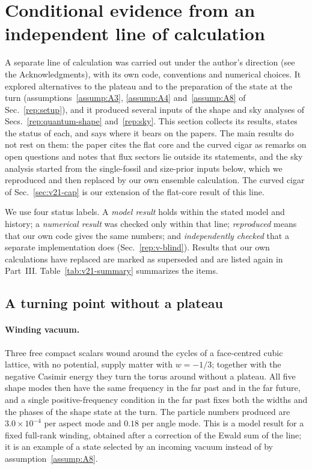 
\section{Conditional evidence from an independent line of calculation}\label{rep:v-conditional}

A separate line of calculation was carried out under the author's direction (see the Acknowledgments), with its own code, conventions and numerical choices.
It explored alternatives to the plateau and to the preparation of the state at the turn (assumptions~\ref{assump:A3}, \ref{assump:A4} and~\ref{assump:A8} of Sec.~\ref{rep:setup}), and it produced several inputs of the shape and sky analyses of Secs.~\ref{rep:quantum-shape} and~\ref{rep:sky}.
This section collects its results, states the status of each, and says where it bears on the papers.
The main results do not rest on them: the paper cites the flat core and the curved cigar as remarks on open questions and notes that flux sectors lie outside its statements, and the sky analysis started from the single-fossil and size-prior inputs below, which we reproduced and then replaced by our own ensemble calculation.
The curved cigar of Sec.~\ref{sec:v21-cap} is our extension of the flat-core result of this line.

We use four status labels.
A \emph{model result} holds within the stated model and history; a \emph{numerical result} was checked only within that line; \emph{reproduced} means that our own code gives the same numbers; and \emph{independently checked} that a separate implementation does (Sec.~\ref{rep:v-blind}).
Results that our own calculations have replaced are marked as superseded and are listed again in Part~III.
Table~\ref{tab:v21-summary} summarizes the items.

\subsection{A turning point without a plateau}\label{sec:v21-noplateau}

\paragraph{Winding vacuum.}
Three free compact scalars wound around the cycles of a face-centred cubic lattice, with no potential, supply matter with $w=-1/3$; together with the negative Casimir energy they turn the torus around without a plateau.
All five shape modes then have the same frequency in the far past and in the far future, and a single positive-frequency condition in the far past fixes both the widths and the phases of the shape state at the turn.
The particle numbers produced are $3.0\times10^{-4}$ per aspect mode and $0.18$ per angle mode. %
This is a model result for a fixed full-rank winding, obtained after a correction of the Ewald sum of the line; it is an example of a state selected by an incoming vacuum instead of by assumption~\ref{assump:A8}.

